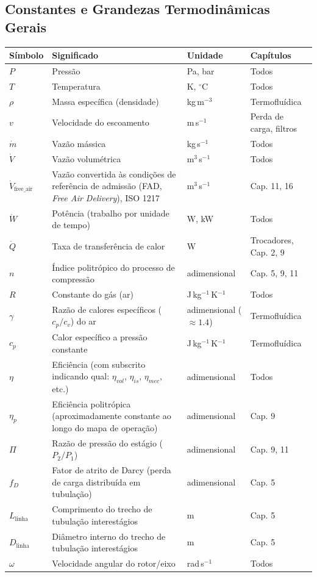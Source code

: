 \documentclass[12pt,a4paper]{article}
\numberwithin{equation}{section}
\numberwithin{table}{section}
\numberwithin{figure}{section}
\begin{document}
{\small
\setlength{\tabcolsep}{3pt}
\renewcommand{\arraystretch}{1.15}

\subsection*{Constantes e Grandezas Termodinâmicas Gerais}
\begin{longtable}{>{\raggedright\arraybackslash}p{2.8cm} >{\raggedright\arraybackslash}p{5.3cm} >{\raggedright\arraybackslash}p{2.1cm} >{\raggedright\arraybackslash}p{4.2cm}}
	\toprule
	\textbf{Símbolo} & \textbf{Significado} & \textbf{Unidade} & \textbf{Capítulos} \\ \midrule
	\endhead
	$P$ & Pressão & Pa, bar & Todos \\
	$T$ & Temperatura & K, $^{\circ}$C & Todos \\
	$\rho$ & Massa específica (densidade) & kg\,m$^{-3}$ & Termofluídica \\
	$v$ & Velocidade do escoamento & m\,s$^{-1}$ & Perda de carga, filtros \\
	$\dot{m}$ & Vazão mássica & kg\,s$^{-1}$ & Todos \\
	$\dot{V}$ & Vazão volumétrica & m$^3$\,s$^{-1}$ & Todos \\
	$\dot{V}_{\text{free\_air}}$ & Vazão convertida às condições de referência de admissão (FAD, \textit{Free Air Delivery}), ISO 1217 & m$^3$\,s$^{-1}$ & Cap. 11, 16 \\
	$\dot{W}$ & Potência (trabalho por unidade de tempo) & W, kW & Todos \\
	$\dot{Q}$ & Taxa de transferência de calor & W & Trocadores, Cap. 2, 9 \\
	$n$ & Índice politrópico do processo de compressão & adimensional & Cap. 5, 9, 11 \\
	$R$ & Constante do gás (ar) & J\,kg$^{-1}$\,K$^{-1}$ & Todos \\
	$\gamma$ & Razão de calores específicos ($c_p/c_v$) do ar & adimensional ($\approx 1.4$) & Termofluídica \\
	$c_p$ & Calor específico a pressão constante & J\,kg$^{-1}$\,K$^{-1}$ & Termofluídica \\
	$\eta$ & Eficiência (com subscrito indicando qual: $\eta_{vol}$, $\eta_{is}$, $\eta_{mec}$, etc.) & adimensional & Todos \\
	$\eta_p$ & Eficiência politrópica (aproximadamente constante ao longo do mapa de operação) & adimensional & Cap. 9 \\
	$\Pi$ & Razão de pressão do estágio ($P_2/P_1$) & adimensional & Cap. 9, 11 \\
	$f_D$\dag & Fator de atrito de Darcy (perda de carga distribuída em tubulação) & adimensional & Cap. 5 \\
	$L_{\text{linha}}$ & Comprimento do trecho de tubulação interestágios & m & Cap. 5 \\
	$D_{\text{linha}}$ & Diâmetro interno do trecho de tubulação interestágios & m & Cap. 5 \\
	$\omega$ & Velocidade angular do rotor/eixo & rad\,s$^{-1}$ & Todos \\ \bottomrule
\end{longtable}

}
\end{document}
